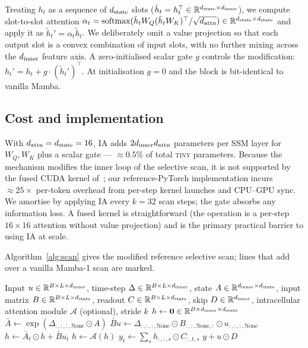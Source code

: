 Treating $h_t$ as a sequence of $d_{\text{state}}$ slots ($\tilde h_t = h_t^\top \in \mathbb{R}^{d_{\text{state}} \times d_{\text{inner}}}$), we compute slot-to-slot attention $\alpha_t = \mathrm{softmax}(\tilde h_t W_Q (\tilde h_t W_K)^\top / \sqrt{d_{\text{attn}}}) \in \mathbb{R}^{d_{\text{state}} \times d_{\text{state}}}$ and apply it as $\tilde h_t' = \alpha_t \tilde h_t$. We deliberately omit a value projection so that each output slot is a convex combination of input slots, with no further mixing across the $d_{\text{inner}}$ feature axis. A zero-initialised scalar gate $g$ controls the modification: $h_t' = h_t + g \cdot (\tilde h_t')^\top$. At initialisation $g = 0$ and the block is bit-identical to vanilla Mamba.

\subsection{Cost and implementation}

With $d_{\text{attn}} = d_{\text{state}} = 16$, IA adds $2d_{\text{inner}} d_{\text{attn}}$ parameters per SSM layer for $W_Q, W_K$ plus a scalar gate --- $\approx 0.5\%$ of total \textsc{tiny} parameters. Because the mechanism modifies the inner loop of the selective scan, it is not supported by the fused CUDA kernel of~\citet{gu2023mamba}; our reference-PyTorch implementation incurs $\approx 25\times$ per-token overhead from per-step kernel launches and CPU--GPU sync. We amortise by applying IA every $k=32$ scan steps; the gate absorbs any information loss. A fused kernel is straightforward (the operation is a per-step $16 \times 16$ attention without value projection) and is the primary practical barrier to using IA at scale.

Algorithm~\ref{alg:scan} gives the modified reference selective scan; lines that add over a vanilla Mamba-1 scan are marked.

\begin{algorithm}[h]
\caption{Selective scan with intracellular attention.}
\label{alg:scan}
\begin{algorithmic}[1]
\Require Input $u \in \mathbb{R}^{B \times L \times d_{\text{inner}}}$, time-step $\Delta \in \mathbb{R}^{B \times L \times d_{\text{inner}}}$, state $A \in \mathbb{R}^{d_{\text{inner}} \times d_{\text{state}}}$, input matrix $B \in \mathbb{R}^{B \times L \times d_{\text{state}}}$, readout $C \in \mathbb{R}^{B \times L \times d_{\text{state}}}$, skip $D \in \mathbb{R}^{d_{\text{inner}}}$, intracellular attention module $\mathcal{A}$ (optional), stride $k$
\State $h \gets \mathbf{0} \in \mathbb{R}^{B \times d_{\text{inner}} \times d_{\text{state}}}$
\State $\bar A \gets \exp(\Delta_{:,:,:,\text{None}} \odot A)$
\State $\bar B u \gets \Delta_{:,:,:,\text{None}} \odot B_{:,:,\text{None},:} \odot u_{:,:,:,\text{None}}$
    \State $h \gets \bar A_t \odot h + \bar B u_t$
        \State $h \gets \mathcal{A}(h)$ 
    \EndIf
    \State $y_t \gets \sum_{s} h_{:, :, s} \odot C_{:, t, s}$
\EndFor
\State \Return $y + u \odot D$
\end{algorithmic}
\end{algorithm}

